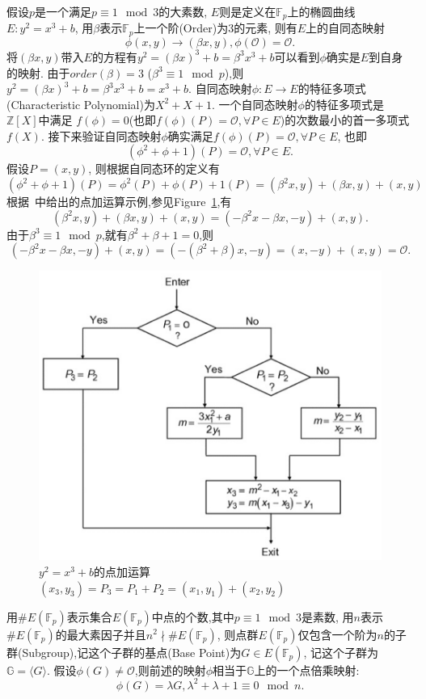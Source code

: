 \documentclass{article}
\renewcommand{\G}{\mathbb{G}}
\newcommand{\Z}{\mathbb{Z}}
\newcommand{\F}{\mathbb{F}}
\begin{document}
假设$p$是一个满足$p\equiv 1 \mod 3$的大素数, $E$则是定义在$\F_p$上的椭圆曲线$E: y^2 = x^3 + b$,
用$\beta$表示$\F_p$上一个阶(Order)为3的元素, 则有$E$上的自同态映射
$$\phi(x,y) \rightarrow (\beta x, y), \phi(\mathcal{O}) = \mathcal{O}.$$
将$(\beta x, y)$带入$E$的方程有$y^2 = (\beta x)^3 + b = \beta^3x^3 + b$可以看到$\phi$确实是$E$到自身的映射.
由于$order(\beta)=3$ ($\beta^3 \equiv 1 \mod p$),则$y^2 = (\beta x)^3 + b = \beta^3x^3 + b  = x^3 + b$.
自同态映射$\phi: E \rightarrow E$的特征多项式(Characteristic Polynomial)为$X^2 + X + 1$.
一个自同态映射$\phi$的特征多项式是$\Z[X]$中满足
$f(\phi)=0$(也即$f(\phi)(P)=\mathcal{O}, \forall P\in E$)的次数最小的首一多项式$f(X)$.
接下来验证自同态映射$\phi$确实满足$f(\phi)(P)=\mathcal{O}, \forall P\in E$, 也即
$$(\phi^2+\phi+1)(P) = \mathcal{O}, \forall P \in E.$$
假设$P=(x,y)$, 则根据自同态环的定义有
$$(\phi^2+\phi+1)(P) = \phi^2(P) + \phi(P) +1(P) = (\beta^2 x, y) + (\beta x, y) + (x,y)$$
根据~\cite{Blahut14}中给出的点加运算示例,参见Figure~\ref{fig-ecpoint-add},有
 $$(\beta^2 x, y) + (\beta x, y) + (x,y) = (-\beta^2 x -\beta x, -y) + (x,y).$$
 由于$\beta^3 \equiv 1 \mod p$,就有$\beta^2+\beta+1=0$,则
$$ (-\beta^2 x -\beta x, -y) + (x,y) = (-(\beta^2+\beta) x, -y) = (x,-y) + (x,y) = \mathcal{O}.$$
 
\begin{figure}
\centering
\includegraphics[width=.7\textwidth]{ec-point-addition.png}
\caption{$y^2=x^3+b$的点加运算$(x_3,y_3)=P_3=P_1+P_2=(x_1,y_1) + (x_2,y_2)$}\label{fig-ecpoint-add}
\end{figure}

用$\#E(\F_p)$表示集合$E(\F_p)$中点的个数,其中$p \equiv 1 \mod 3$是素数,
用$n$表示$\#E(\F_p)$的最大素因子并且$n^2 \nmid \#E(\F_p)$,
则点群$E(\F_p)$仅包含一个阶为$n$的子群(Subgroup),记这个子群的基点(Base Point)为$G\in E(\F_p)$, 
记这个子群为$\G = \langle G \rangle$. 
假设$\phi(G)\neq \mathcal{O}$,则前述的映射$\phi$相当于$\G$上的一个点倍乘映射:
$$
\phi(G) = \lambda G, \lambda^2+\lambda+1\equiv 0 \mod n.
$$
\end{document}
